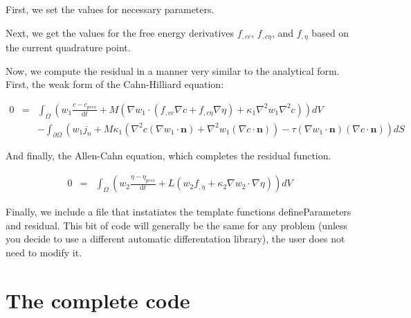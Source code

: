First, we set the values for necessary parameters.


\begin{DoxyCodeInclude}

\end{DoxyCodeInclude}


Next, we get the values for the free energy derivatives $f_{,cc}$, $f_{,c\eta}$, and $f_{,\eta}$ based on the current quadrature point.


\begin{DoxyCodeInclude}

\end{DoxyCodeInclude}


Now, we compute the residual in a manner very similar to the analytical form. First, the weak form of the Cahn-\/\-Hilliard equation\-:

\begin{eqnarray*} 0 &=& \int_\Omega \left(w_1\frac{c - c_{prev}}{\mathrm{d}t} + M\left(\nabla w_1\cdot(f_{,cc}\nabla c + f_{,c\eta}\nabla\eta) + \kappa_1\nabla^2 w_1\nabla^2 c\right)\right) dV\\ &\phantom{=}& - \int_{\partial\Omega} \left(w_1j_n + M\kappa_1\left(\nabla^2c(\nabla w_1\cdot\boldsymbol{n}) + \nabla^2w_1(\nabla c\cdot\boldsymbol{n})\right) - \tau(\nabla w_1\cdot\boldsymbol{n})(\nabla c\cdot\boldsymbol{n})\right) dS \end{eqnarray*}


\begin{DoxyCodeInclude}

\end{DoxyCodeInclude}


And finally, the Allen-\/\-Cahn equation, which completes the residual function.

\begin{eqnarray*} 0 &=& \int_\Omega \left(w_2\frac{\eta - \eta_{prev}}{\mathrm{d}t} + L\left(w_2 f_{,\eta} + \kappa_2\nabla w_2\cdot\nabla \eta\right)\right) dV \end{eqnarray*} 
\begin{DoxyCodeInclude}

\end{DoxyCodeInclude}


Finally, we include a file that instatiates the template functions {\ttfamily define\-Parameters} and {\ttfamily residual}. This bit of code will generally be the same for any problem (unless you decide to use a different automatic differentation library), the user does not need to modify it.


\begin{DoxyCodeInclude}

\end{DoxyCodeInclude}


\section*{The complete code }


\begin{DoxyCodeInclude}
\end{DoxyCodeInclude}
 